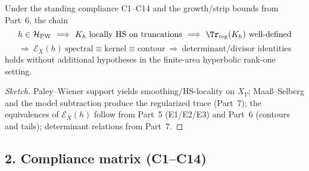 \begin{proposition}\relax\hspace{0pt}
\label{prop:tfc8-flow}\relax\hspace{0pt}
Under the standing compliance C1--C14 and the growth/strip bounds from Part~6, the chain
\[
h\in\mathcal{H}_{\mathrm{PW}} \ \Longrightarrow\  K_h\ \text{locally HS on truncations}\ \Longrightarrow\  \Tr_{\mathrm{reg}}(K_h)\ \text{well-defined}
\]
\[
\Longrightarrow\  \mathcal{E}_X(h)\ \text{spectral} \equiv \text{kernel} \equiv \text{contour} \ \Longrightarrow\  \text{determinant/divisor identities}
\]
holds without additional hypotheses in the finite-area hyperbolic rank-one setting. \relax\hspace{0pt}
\end{proposition}

\begin{proof}[Sketch]\relax\hspace{0pt}
Paley–Wiener support yields smoothing/HS-locality on $X_Y$; Maa\ss--Selberg and the model subtraction produce the regularized trace (Part~7); the equivalences of $\mathcal{E}_X(h)$ follow from Part~5 (E1/E2/E3) and Part~6 (contours and tails); determinant relations from Part~7. \relax\hspace{0pt}
\end{proof}

\subsection*{2. Compliance matrix (C1–C14)}\relax\hspace{0pt}
\label{subsec:tfc8-compliance} %

